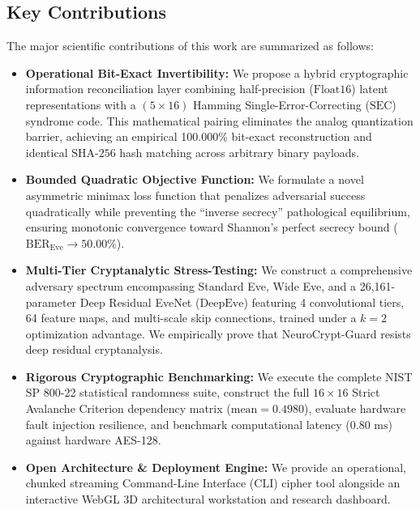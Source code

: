 \documentclass[journal,10pt,twocolumn]{IEEEtran}
\begin{document}
\subsection{Key Contributions}
The major scientific contributions of this work are summarized as follows:
\begin{itemize}
    \item \textbf{Operational Bit-Exact Invertibility:} We propose a hybrid cryptographic information reconciliation layer combining half-precision ($\text{Float16}$) latent representations with a $(5 \times 16)$ Hamming Single-Error-Correcting ($\text{SEC}$) syndrome code. This mathematical pairing eliminates the analog quantization barrier, achieving an empirical 100.000\% bit-exact reconstruction and identical $\text{SHA-256}$ hash matching across arbitrary binary payloads.
    \item \textbf{Bounded Quadratic Objective Function:} We formulate a novel asymmetric minimax loss function that penalizes adversarial success quadratically while preventing the ``inverse secrecy'' pathological equilibrium, ensuring monotonic convergence toward Shannon's perfect secrecy bound ($\text{BER}_{\text{Eve}} \to 50.00\%$).
    \item \textbf{Multi-Tier Cryptanalytic Stress-Testing:} We construct a comprehensive adversary spectrum encompassing Standard Eve, Wide Eve, and a 26,161-parameter Deep Residual EveNet ($\text{DeepEve}$) featuring 4 convolutional tiers, 64 feature maps, and multi-scale skip connections, trained under a $k=2$ optimization advantage. We empirically prove that NeuroCrypt-Guard resists deep residual cryptanalysis.
    \item \textbf{Rigorous Cryptographic Benchmarking:} We execute the complete NIST SP 800-22 statistical randomness suite, construct the full $16 \times 16$ Strict Avalanche Criterion dependency matrix ($\text{mean} = 0.4980$), evaluate hardware fault injection resilience, and benchmark computational latency ($0.80\text{ ms}$) against hardware AES-128.
    \item \textbf{Open Architecture & Deployment Engine:} We provide an operational, chunked streaming Command-Line Interface ($\text{CLI}$) cipher tool alongside an interactive WebGL 3D architectural workstation and research dashboard.
\end{itemize}

\end{document}
